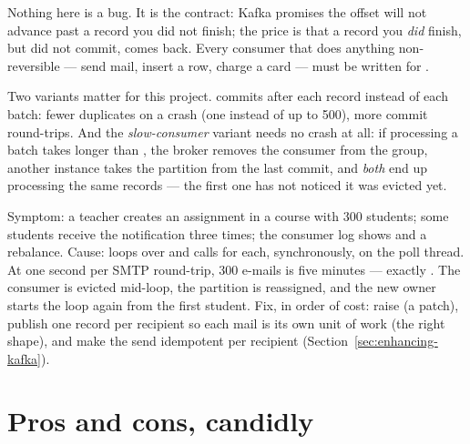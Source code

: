 Nothing here is a bug. It is the contract: Kafka promises the offset
will not advance past a record you did not finish; the price is that a
record you \emph{did} finish, but did not commit, comes back. Every
consumer that does anything non-reversible --- send mail, insert a row,
charge a card --- must be written for .

Two variants matter for this project.  commits
after each record instead of each batch: fewer duplicates on a crash
(one instead of up to 500), more commit round-trips. And the
\emph{slow-consumer} variant needs no crash at all: if processing a
batch takes longer than , the broker removes
the consumer from the group, another instance takes the partition from
the last commit, and \emph{both} end up processing the same records ---
the first one has not noticed it was evicted yet.

\begin{pitfall}
Symptom: a teacher creates an assignment in a course with 300 students;
some students receive the notification three times; the consumer log
shows  and a rebalance. Cause:
 loops over
 and calls  for
each, synchronously, on the poll thread. At one second per SMTP
round-trip, 300 e-mails is five minutes --- exactly
. The consumer is evicted mid-loop, the
partition is reassigned, and the new owner starts the loop again from
the first student. Fix, in order of cost: raise
 (a patch), publish one
 record per recipient so each mail is its
own unit of work (the right shape), and make the send idempotent per
recipient (Section~\ref{sec:enhancing-kafka}).
\end{pitfall}

\section{Pros and cons, candidly}

